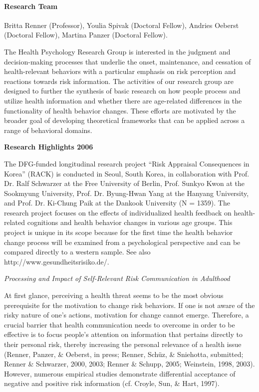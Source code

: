 
\paragraph{Research Team}
Britta Renner (Professor), Youlia Spivak (Doctoral Fellow), Andries Oeberst (Doctoral Fellow), Martina Panzer (Doctoral Fellow).

 The Health Psychology Research Group is interested in the judgment and decision-making processes that underlie the onset, maintenance, and cessation of health-relevant behaviors with a particular emphasis on risk perception and reactions towards risk information. The activities of our research group are designed to further the synthesis of basic research on how people process and utilize health information and whether there are age-related differences in the functionality of health behavior changes. These efforts are motivated by the broader goal of developing theoretical frameworks that can be applied across a range of behavioral domains.

\null
\textbf{Research Highlights 2006}

 The DFG-funded longitudinal research project ``Risk Appraisal Consequences in Korea'' (RACK) is conducted in Seoul, South Korea, in collaboration with Prof. Dr. Ralf Schwarzer at the Free University of Berlin, Prof. Sunkyo Kwon at the Sookmyung University, Prof. Dr. Byung-Hwan Yang at the Hanyang University, and Prof. Dr. Ki-Chung Paik at the Dankook University (N = 1359). The research project focuses on the effects of individualized health feedback on health-related cognitions and health behavior changes in various age groups. This project is unique in its scope because for the first time the health behavior change process will be examined from a psychological perspective and can be compared directly to a western sample. See also http://www.gesundheitsrisiko.de/.

\newpage
\textit{Processing and Impact of Self-Relevant Risk Communication in Adulthood}

 At first glance, perceiving a health threat seems to be the most obvious prerequisite for the motivation to change risk behaviors. If one is not aware of the risky nature of one's actions, motivation for change cannot emerge. Therefore, a crucial barrier that health communication needs to overcome in order to be effective is to focus people's attention on information that pertains directly to their personal risk, thereby increasing the personal relevance of a health issue (Renner, Panzer, \& Oeberst, in press; Renner, Sch\"{u}z, \& Sniehotta, submitted; Renner \& Schwarzer, 2000, 2003; Renner \& Schupp, 2005; Weinstein, 1998, 2003). However, numerous empirical studies demonstrate differential acceptance of negative and positive risk information (cf. Croyle, Sun, \& Hart, 1997).


